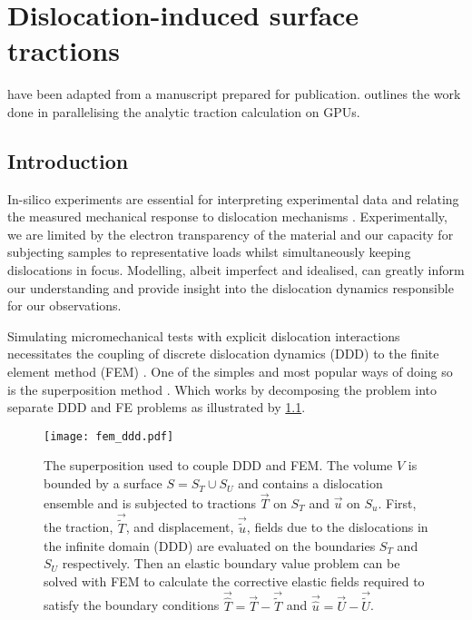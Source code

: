 \chapter{Dislocation-induced surface tractions}
\label{c:tractions}

 have been adapted from a manuscript prepared for publication.  outlines the work done in parallelising the analytic traction calculation on GPUs.

\section{Introduction}\label{s:paperIntro}

In-silico experiments are essential for interpreting experimental data and relating the measured mechanical response to dislocation mechanisms \cite{0965-0393-6-6-007,doi:10.1080/14786430500341250,tarleton2015discrete,YU2018}. Experimentally, we are limited by the electron transparency of the material and our capacity for subjecting samples to representative loads whilst simultaneously keeping dislocations in focus. Modelling, albeit imperfect and idealised, can greatly inform our understanding and provide insight into the dislocation dynamics responsible for our observations.

Simulating micromechanical tests with explicit dislocation interactions necessitates the coupling of discrete dislocation dynamics (DDD) to the finite element method (FEM) \cite{Groh2009}. One of the simples and most popular ways of doing so is the superposition method \cite{superposition_scheme0,superposition_scheme1,superposition_scheme2}. Which works by decomposing the problem into separate DDD and FE problems as illustrated by \cref{f:superposition_scheme}.
\begin{figure}
    \centering
    \texttt{[image: fem\_ddd.pdf]}
    \caption[Superposition Model for DDD-FEM coupling.]{The superposition used to couple DDD and FEM. The volume $V$ is bounded by a surface $S = S_{T} \cup S_{U}$ and contains a dislocation ensemble and is subjected to tractions $\vec{T}$ on $S_{T}$ and $\vec{u}$ on $S_{u}$. First, the traction, $\vec{\tilde{T}}$, and displacement, $\vec{\tilde{u}}$, fields due to the dislocations in the infinite domain (DDD) are evaluated on the boundaries $S_{T}$ and $S_{U}$ respectively. Then an elastic boundary value problem can be solved with FEM to calculate the corrective elastic fields required to satisfy the boundary conditions $\vec{\hat{T}} = \vec{T} - \vec{\tilde{T}}$ and $\vec{\hat{u}} = \vec{U} - \vec{\tilde{U}}$.}
    \label{f:superposition_scheme}
\end{figure}

